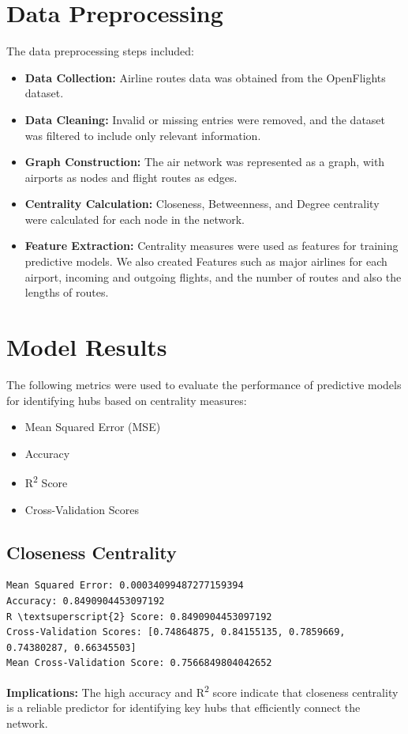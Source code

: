 \documentclass[12pt]{article}
\begin{document}
\section*{Data Preprocessing}
The data preprocessing steps included:
\begin{itemize}
	\item \textbf{Data Collection:} Airline routes data was obtained from the OpenFlights dataset.
	\item \textbf{Data Cleaning:} Invalid or missing entries were removed, and the dataset was filtered to include only relevant information.
	\item \textbf{Graph Construction:} The air network was represented as a graph, with airports as nodes and flight routes as edges.
	\item \textbf{Centrality Calculation:} Closeness, Betweenness, and Degree centrality were calculated for each node in the network.
	\item \textbf{Feature Extraction:} Centrality measures were used as features for training predictive models. We also created Features such as major airlines for each airport, incoming and outgoing flights, and the number of routes and also the lengths of routes.
\end{itemize}

\section*{Model Results}
The following metrics were used to evaluate the performance of predictive models for identifying hubs based on centrality measures:
\begin{itemize}
	\item Mean Squared Error (MSE)
	\item Accuracy
	\item R\textsuperscript{2} Score
	\item Cross-Validation Scores
\end{itemize}

\subsection*{Closeness Centrality}
\begin{verbatim}
Mean Squared Error: 0.00034099487277159394
Accuracy: 0.8490904453097192
R \textsuperscript{2} Score: 0.8490904453097192
Cross-Validation Scores: [0.74864875, 0.84155135, 0.7859669, 0.74380287, 0.66345503]
Mean Cross-Validation Score: 0.7566849804042652
\end{verbatim}
\textbf{Implications:} The high accuracy and R\textsuperscript{2} score indicate that closeness centrality is a reliable predictor for identifying key hubs that efficiently connect the network.
\end{document}
